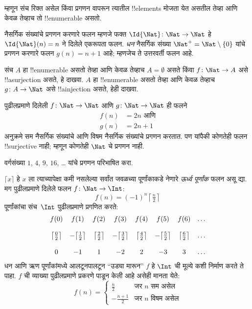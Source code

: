 \documentclass[../../../include/open-logic-section]{subfiles}
\begin{document}
\begin{explain}
म्हणून संच रिक्त असेल किंवा प्रगणन वापरून त्यातील !!{element}s मोजता
येत असतील तेव्हा आणि केवळ तेव्हाच तो !!{enumerable} असतो.
\end{explain}

\begin{ex}
नैसर्गिक संख्यांचे प्रगणन करणारे फलन म्हणजे फक्त $\Id{\Nat} \colon
\Nat \to \Nat$ हे $\Id{\Nat}(n) = n$ ने दिलेले एकरूपता फलन.
\emph{धन} नैसर्गिक संख्या $\Nat^+ = \Nat \setminus \{0\}$ यांचे
प्रगणन करणारे फलन $g(n) = n + 1$ आहे; म्हणजेच ते उत्तरवर्ती फलन आहे.
\end{ex}

\begin{prob}
संच $A$ हा !!{enumerable} असतो तेव्हा आणि केवळ तेव्हाच $A =
\emptyset$ असते किंवा $f\colon \Nat \to A$ असे !!a{surjection}
असते, हे दाखवा. $A$ हा !!{enumerable} असतो तेव्हा आणि केवळ तेव्हाच
$g\colon A \to \Nat$ असे !!a{injection} असते, हेही दाखवा.
\end{prob}

\begin{ex}
पुढीलप्रमाणे दिलेली $f\colon \Nat \to \Nat$ आणि $g \colon \Nat
\to \Nat$ ही फलने
\begin{align*}
  f(n) & = 2n \text{ आणि}\\
  g(n) & = 2n+1
\end{align*}
अनुक्रमे सम नैसर्गिक संख्यांचे आणि विषम नैसर्गिक संख्यांचे प्रगणन
करतात. पण यांपैकी कोणतेही फलन !!{surjective} नाही; म्हणून कोणतेही
$\Nat$ चे प्रगणन नाही.
\end{ex}

\begin{prob}
वर्गसंख्या $1$, $4$, $9$, $16$, \dots{} यांचे प्रगणन परिभाषित करा.
\end{prob}

\begin{ex}
$\lceil x \rceil$ हे $x$ ला त्याच्यापेक्षा कमी नसलेल्या सर्वांत जवळच्या
पूर्णांकाकडे नेणारे \emph{ऊर्ध्व पूर्णांक} फलन असू द्या. मग पुढीलप्रमाणे
दिलेले फलन $f \colon \Nat \to \Int$:
\[
  f(n) = (-1)^{n} \left\lceil\tfrac{n}{2}\right\rceil
\]
पूर्णांकांचा संच~$\Int$ पुढीलप्रमाणे प्रगणित करते:
\[
\begin{array}{c c c c c c c c}
f(0) & f(1) & f(2) & f(3) & f(4) & f(5) & f(6) & \dots \\ \\
\big\lceil \tfrac{0}{2} \big\rceil & -\big\lceil \tfrac{1}{2}\big\rceil &  \big\lceil \tfrac{2}{2} \big\rceil & -\big\lceil \tfrac{3}{2} \big\rceil & \big\lceil \tfrac{4}{2} \big\rceil  & -\big\lceil \tfrac{5}{2}\big\rceil & \big\lceil \tfrac{6}{2} \big\rceil & \dots \\ \\
0 & -1 & 1 & -2 & 2 & -3 & 3& \dots
\end{array}
\]
धन आणि ऋण पूर्णांकांमध्ये आलटूनपालटून ``उड्या मारून'' $f$ हे $\Int$
ची मूल्ये कशी निर्माण करते ते पाहा. $f$ ची व्याख्या पुढीलप्रमाणे
प्रकरणे पाडून केली आहे असेही मानता येते:
\[
f(n) = \begin{cases}
  \frac{n}{2} & \text{जर $n$ सम असेल}\\
  -\frac{n+1}{2} & \text{जर $n$ विषम असेल}
  \end{cases}
\]
\end{ex}
\end{document}
